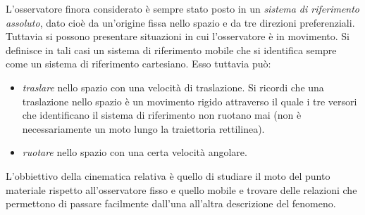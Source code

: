 \documentclass[10pt,a4paper]{book}
\begin{document}
L'osservatore finora considerato è sempre stato posto in un \emph{sistema di riferimento assoluto}, dato cioè da un'origine fissa nello spazio e da tre direzioni preferenziali. Tuttavia si possono presentare situazioni in cui l'osservatore è in movimento. Si definisce in tali casi un sistema di riferimento mobile che si identifica sempre come un sistema di riferimento cartesiano. Esso tuttavia può:
\begin{itemize}
	\item \emph{traslare} nello spazio con una velocità di traslazione. Si ricordi che una traslazione nello spazio è un movimento rigido attraverso il quale i tre versori che identificano il sistema di riferimento non ruotano mai (non è necessariamente un moto lungo la traiettoria rettilinea).
	\item \emph{ruotare} nello spazio con una certa velocità angolare.
\end{itemize}
L'obbiettivo della cinematica relativa è quello di studiare il moto del punto materiale rispetto all'osservatore fisso e quello mobile e trovare delle relazioni che permettono di passare facilmente dall'una all'altra descrizione del fenomeno.
\end{document}
